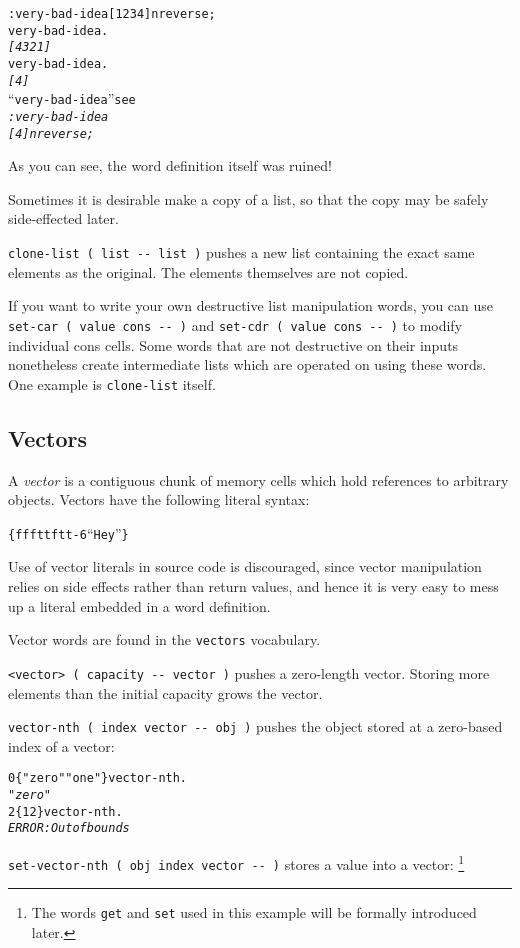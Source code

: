 \documentclass[english]{article}
\begin{document}
\begin{alltt}
: very-bad-idea {[} 1 2 3 4 {]} nreverse ;
very-bad-idea .
\emph{{[} 4 3 2 1 {]}}
very-bad-idea .
\emph{{[} 4 {]}}
{}``very-bad-idea'' see
\emph{: very-bad-idea}
 \emph{   {[} 4 {]} nreverse ;}
\end{alltt}
As you can see, the word definition itself was ruined!

Sometimes it is desirable make a copy of a list, so that the copy
may be safely side-effected later.

\texttt{clone-list ( list -{}- list )} pushes a new list containing
the exact same elements as the original. The elements themselves are
not copied.

If you want to write your own destructive list manipulation words,
you can use \texttt{set-car ( value cons -{}- )} and \texttt{set-cdr
( value cons -{}- )} to modify individual cons cells. Some words that
are not destructive on their inputs nonetheless create intermediate
lists which are operated on using these words. One example is \texttt{clone-list}
itself.


\subsection{\label{sub:Vectors}Vectors}

A \emph{vector} is a contiguous chunk of memory cells which hold references to arbitrary
objects. Vectors have the following literal syntax:

\begin{alltt}
\{ f f f t t f t t -6 {}``Hey'' \}
\end{alltt}
Use of vector literals in source code is discouraged, since vector
manipulation relies on side effects rather than return values, and
hence it is very easy to mess up a literal embedded in a word definition.

Vector words are found in the \texttt{vectors} vocabulary.

\texttt{<vector> ( capacity -{}- vector )} pushes a zero-length vector.
Storing more elements than the initial capacity grows the vector.

\texttt{vector-nth ( index vector -{}- obj )} pushes the object stored
at a zero-based index of a vector:

\begin{alltt}
0 \{ "zero" "one" \} vector-nth .
\emph{"zero"}
2 \{ 1 2 \} vector-nth .
\emph{ERROR: Out of bounds}
\end{alltt}
\texttt{set-vector-nth ( obj index vector -{}- )} stores a value into
a vector:%
\footnote{The words \texttt{get} and \texttt{set} used in this example will
be formally introduced later.%
}
\end{document}
